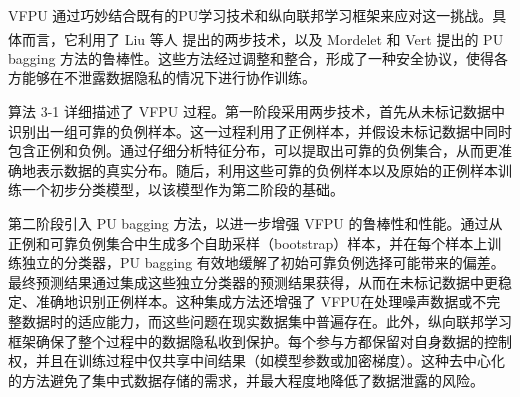VFPU 通过巧妙结合既有的PU学习技术和纵向联邦学习框架来应对这一挑战。具体而言，它利用了 Liu 等人\textsuperscript{\cite{liu2003building}} 提出的两步技术，以及 Mordelet 和 Vert \textsuperscript{\cite{mordelet2014bagging}} 提出的 PU bagging 方法的鲁棒性。这些方法经过调整和整合，形成了一种安全协议，使得各方能够在不泄露数据隐私的情况下进行协作训练。

算法 3-1 详细描述了 VFPU 过程。第一阶段采用两步技术，首先从未标记数据中识别出一组可靠的负例样本。这一过程利用了正例样本，并假设未标记数据中同时包含正例和负例。通过仔细分析特征分布，可以提取出可靠的负例集合，从而更准确地表示数据的真实分布。随后，利用这些可靠的负例样本以及原始的正例样本训练一个初步分类模型，以该模型作为第二阶段的基础。

第二阶段引入 PU bagging 方法，以进一步增强 VFPU 的鲁棒性和性能。通过从正例和可靠负例集合中生成多个自助采样（bootstrap）样本，并在每个样本上训练独立的分类器，PU bagging 有效地缓解了初始可靠负例选择可能带来的偏差。最终预测结果通过集成这些独立分类器的预测结果获得，从而在未标记数据中更稳定、准确地识别正例样本。这种集成方法还增强了 VFPU在处理噪声数据或不完整数据时的适应能力，而这些问题在现实数据集中普遍存在。此外，纵向联邦学习框架确保了整个过程中的数据隐私收到保护。每个参与方都保留对自身数据的控制权，并且在训练过程中仅共享中间结果（如模型参数或加密梯度）。这种去中心化的方法避免了集中式数据存储的需求，并最大程度地降低了数据泄露的风险。

